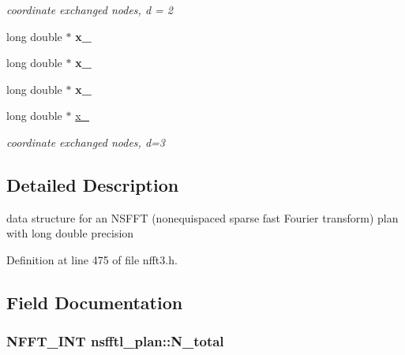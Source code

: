 \begin{DoxyCompactItemize}
\begin{DoxyCompactList}\small\item\em coordinate exchanged nodes, d = 2 \end{DoxyCompactList}\item 
\hypertarget{structnsfftl__plan_ab4ce3bd81b5bab3e868227cbe2e50101}{long double $\ast$ {\bfseries x\-\_}}\label{structnsfftl__plan_ab4ce3bd81b5bab3e868227cbe2e50101}

\item 
\hypertarget{structnsfftl__plan_a233cf0ab307992432bcfcd6f34f20937}{long double $\ast$ {\bfseries x\-\_}}\label{structnsfftl__plan_a233cf0ab307992432bcfcd6f34f20937}

\item 
\hypertarget{structnsfftl__plan_a965b92ec4facc3db597e1fb4fb300aed}{long double $\ast$ {\bfseries x\-\_}}\label{structnsfftl__plan_a965b92ec4facc3db597e1fb4fb300aed}

\item 
\hypertarget{structnsfftl__plan_a62e8e58fe1b84f82ac85301a091af3fa}{long double $\ast$ \hyperlink{structnsfftl__plan_a62e8e58fe1b84f82ac85301a091af3fa}{x\-\_}}\label{structnsfftl__plan_a62e8e58fe1b84f82ac85301a091af3fa}

\begin{DoxyCompactList}\small\item\em coordinate exchanged nodes, d=3 \end{DoxyCompactList}\end{DoxyCompactItemize}


\subsection{Detailed Description}
data structure for an N\-S\-F\-F\-T (nonequispaced sparse fast Fourier transform) plan with long double precision 

Definition at line 475 of file nfft3.\-h.



\subsection{Field Documentation}
\hypertarget{structnsfftl__plan_ab66e293cd22d1112f71762d7656692ff}{
\subsubsection[{N\-\_\-total}]{\setlength{\rightskip}{0pt plus 5cm}N\-F\-F\-T\-\_\-\-I\-N\-T nsfftl\-\_\-plan\-::\-N\-\_\-total}}\label{structnsfftl__plan_ab66e293cd22d1112f71762d7656692ff}


